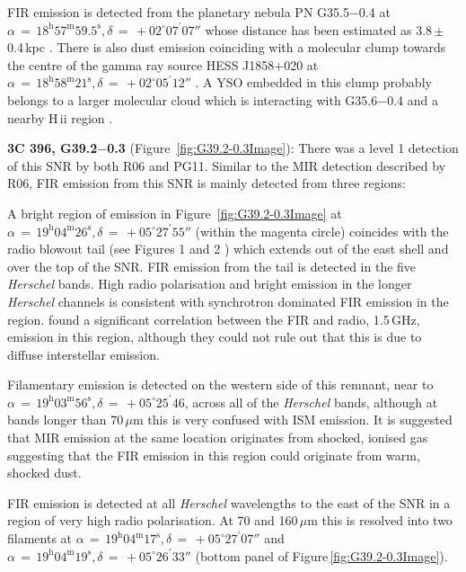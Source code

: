 \documentclass[fleqn,usenatbib]{mnras}
\begin{document}
{FIR emission is detected from the planetary nebula PN G35.5$-$0.4 at $\alpha\,=\,18^\text{h}57^\text{m}59.5^\text{s}, \delta\,=\,+02^\circ07^\prime07''$ whose distance has been estimated as 3.8\,$\pm$\,0.4\,kpc \citep{Zhu2013}. There is also dust emission coinciding with a molecular clump towards the centre of the gamma ray source HESS J1858+020 at $\alpha\,=\,18^\text{h}58^\text{m}21^\text{s}, \delta\,=\,+02^\circ05^\prime12''$ \citep{HESS2008c}. A YSO embedded in this clump probably belongs to a larger molecular cloud which is interacting with G35.6$-$0.4 and a nearby H\,{\sc ii} region \citep{Paron2011}.
\bigskip

\textbf{3C 396, G39.2$-$0.3} (Figure~\ref{fig:G39.2-0.3Image}): There was a level 1 detection of this SNR by both R06 and PG11. Similar to the MIR detection described by R06, FIR emission from this SNR is mainly detected from three regions:

A bright region of emission in Figure~\ref{fig:G39.2-0.3Image} at $\alpha\,=\,19^\text{h}04^\text{m}26^\text{s}, \delta\,=\,+05^\circ27^\prime55''$ (within the magenta circle) coincides with the radio blowout tail (see \citealp{Patnaik1990} Figures 1 and 2 ) which extends out of the east shell and over the top of the SNR. FIR emission from the tail is detected in the five \textit{Herschel} bands. High radio polarisation and bright emission in the longer \textit{Herschel} channels is consistent with synchrotron dominated FIR emission in the region. \cite{Cruciani2016} found a significant correlation between the FIR and radio, 1.5\,GHz, emission in this region, although they could not rule out that this is due to diffuse interstellar emission.

Filamentary emission is detected on the western side of this remnant, near to $\alpha\,=\,19^\text{h}03^\text{m}56^\text{s}, \delta\,=\,+05^\circ25^\prime46$, across all of the \textit{Herschel} bands, although at bands longer than 70\,$\mu$m this is very confused with ISM emission. It is suggested that MIR emission at the same location originates from shocked, ionised gas \citep{Reach2006} suggesting that the FIR emission in this region could originate from warm, shocked dust.

FIR emission is detected at all \textit{Herschel} wavelengths to the east of the SNR in a region of very high radio polarisation. At 70 and 160\,$\mu$m this is resolved into two filaments at $\alpha\,=\,19^\text{h}04^\text{m}17^\text{s}, \delta\,=\,+05^\circ27^\prime07''$ and $\alpha\,=\,19^\text{h}04^\text{m}19^\text{s}, \delta\,=\,+05^\circ26^\prime33''$ (bottom panel of Figure\,\ref{fig:G39.2-0.3Image}).
\bigskip

}
\end{document}
